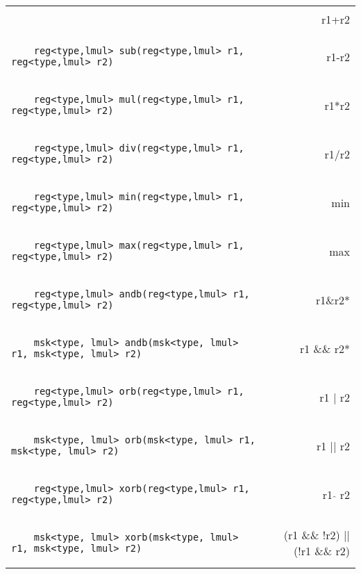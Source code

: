 \begin{center}
\begin{longtable}{l r}
\begin{lstlisting}
\end{lstlisting} & r1+r2\\
\begin{lstlisting}
    reg<type,lmul> sub(reg<type,lmul> r1, reg<type,lmul> r2)
\end{lstlisting} & r1-r2\\
\begin{lstlisting}
    reg<type,lmul> mul(reg<type,lmul> r1, reg<type,lmul> r2)
\end{lstlisting} & r1*r2\\
\begin{lstlisting}
    reg<type,lmul> div(reg<type,lmul> r1, reg<type,lmul> r2)
\end{lstlisting} & r1/r2\\
\begin{lstlisting}
    reg<type,lmul> min(reg<type,lmul> r1, reg<type,lmul> r2)
\end{lstlisting} & min\\
\begin{lstlisting}
    reg<type,lmul> max(reg<type,lmul> r1, reg<type,lmul> r2)
\end{lstlisting} & max\\
\begin{lstlisting}
    reg<type,lmul> andb(reg<type,lmul> r1, reg<type,lmul> r2)
\end{lstlisting} & r1\&r2*\\
\begin{lstlisting}
    msk<type, lmul> andb(msk<type, lmul> r1, msk<type, lmul> r2)
\end{lstlisting} & r1 \&\& r2*\\
\begin{lstlisting}
    reg<type,lmul> orb(reg<type,lmul> r1, reg<type,lmul> r2)
\end{lstlisting} & r1 | r2\\
\begin{lstlisting}
    msk<type, lmul> orb(msk<type, lmul> r1, msk<type, lmul> r2)
\end{lstlisting} & r1 || r2\\
\begin{lstlisting}
    reg<type,lmul> xorb(reg<type,lmul> r1, reg<type,lmul> r2)
\end{lstlisting} & r1 $\hat{ }$ r2\\
\begin{lstlisting}
    msk<type, lmul> xorb(msk<type, lmul> r1, msk<type, lmul> r2)
\end{lstlisting} & (r1 \tiny{\&\&} \small !r2)  || (!r1 \tiny{\&\&} \small r2)\\

\end{longtable}
\end{center}
